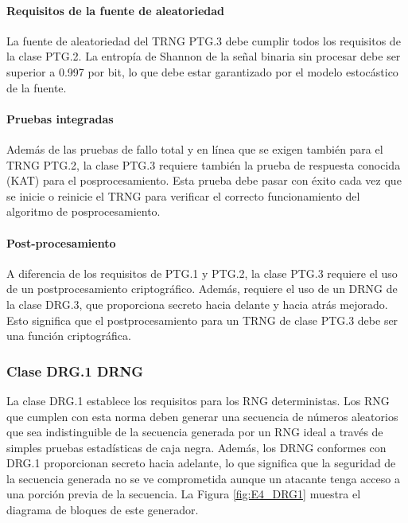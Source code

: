                 \paragraph{Requisitos de la fuente de aleatoriedad\\}
            
                La fuente de aleatoriedad del TRNG PTG.3 debe cumplir todos los requisitos de la clase PTG.2. La entropía de Shannon de la señal binaria sin procesar debe ser superior a 0.997 por bit, lo que debe estar garantizado por el modelo estocástico de la fuente.

                \paragraph{Pruebas integradas\\}
            
                Además de las pruebas de fallo total y en línea que se exigen también para el TRNG PTG.2, la clase PTG.3 requiere también la prueba de respuesta conocida (KAT) para el posprocesamiento. Esta prueba debe pasar con éxito cada vez que se inicie o reinicie el TRNG para verificar el correcto funcionamiento del algoritmo de posprocesamiento.
                
                \paragraph{Post-procesamiento\\}
            
                A diferencia de los requisitos de PTG.1 y PTG.2, la clase PTG.3 requiere el uso de un postprocesamiento criptográfico. Además, requiere el uso de un DRNG de la clase DRG.3, que proporciona secreto hacia delante y hacia atrás mejorado. Esto significa que el postprocesamiento para un TRNG de clase PTG.3 debe ser una función criptográfica.

            \subsubsection{Clase DRG.1 DRNG}

                La clase DRG.1 establece los requisitos para los RNG deterministas. Los RNG que cumplen con esta norma deben generar una secuencia de números aleatorios que sea indistinguible de la secuencia generada por un RNG ideal a través de simples pruebas estadísticas de caja negra. Además, los DRNG conformes con DRG.1 proporcionan secreto hacia adelante, lo que significa que la seguridad de la secuencia generada no se ve comprometida aunque un atacante tenga acceso a una porción previa de la secuencia. La Figura \ref{fig:E4_DRG1} muestra el diagrama de bloques de este generador.

